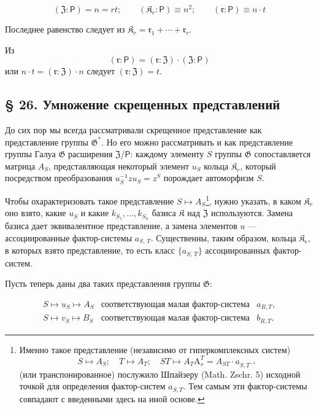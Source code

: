 \documentclass[11pt]{article}
\newcommand{\srcfn}[2]{\footnote{#2}}
\begin{document}
\[
(\mathfrak Z:\mathsf{P})=n=rt;\qquad (\mathfrak K_r:\mathsf{P})\equiv n^2;\qquad (\mathfrak r:\mathsf{P})\equiv n\cdot t
\]

Последнее равенство следует из \(\mathfrak K_r = \mathfrak{r}_1 + \cdots + \mathfrak{r}_r\).

Из
\[(\mathfrak{r}: \mathsf{P}) = (\mathfrak{r}: \mathfrak Z) \cdot (\mathfrak Z: \mathsf{P})\]
или \(n \cdot t = (\mathfrak{r}: \mathfrak Z) \cdot n\) следует \((\mathfrak{r}: \mathfrak Z) = t\).

\subsection*{§ 26. Умножение скрещенных представлений}\label{multiplikation-der-verschraenkten-darstellungen}

До сих пор мы всегда рассматривали скрещенное представление как представление группы \(\mathfrak{G}^*\). Но его можно рассматривать и как представление группы Галуа \(\mathfrak{G}\) расширения \(\mathfrak Z/\mathsf{P}\): каждому элементу \(S\) группы \(\mathfrak{G}\) сопоставляется матрица \(A_S\), представляющая некоторый элемент \(u_S\) кольца \(\mathfrak K_r\), который посредством преобразования \(u_S^{-1}zu_S=z^S\) порождает автоморфизм \(S\).

Чтобы охарактеризовать такое представление \(S\mapsto A_S\)\srcfn{1}{Именно такое представление (независимо от гиперкомплексных систем)
\[
S\mapsto A_S;\quad T\mapsto A_T;\quad ST\mapsto A_T\mathrm{A}_s^T=A_{ST}\cdot a_{S,T^{-1}}
\]
(или транспонированное) послужило Шпайзеру (Math. Zschr. 5) исходной точкой для определения фактор-систем \(a_{S,T}\). Тем самым эти фактор-системы совпадают с введенными здесь на иной основе.}, нужно указать, в каком \(\mathfrak K_r\) оно взято, какие \(u_S\) и какие \(k_{S_1},\ldots,k_{S_n}\) базиса \(\mathfrak K\) над \(\mathfrak Z\) используются. Замена базиса дает эквивалентное представление, а замена элементов \(u\) --- ассоциированные фактор-системы \(a_{S,\,T}\). Существенны, таким образом, кольца \(\mathfrak K_r\), в которых взято представление, то есть класс \(\{a_{S,\,T}\}\) ассоциированных фактор-систем.

Пусть теперь даны два таких представления группы \(\mathfrak G\):

\[
\begin{array}{lll}
S\mapsto u_S\mapsto A_S & \text{соответствующая малая фактор-система} & a_{R,T},\\
S\mapsto v_S\mapsto B_S & \text{соответствующая малая фактор-система} & b_{R,T}.
\end{array}
\]
\end{document}
